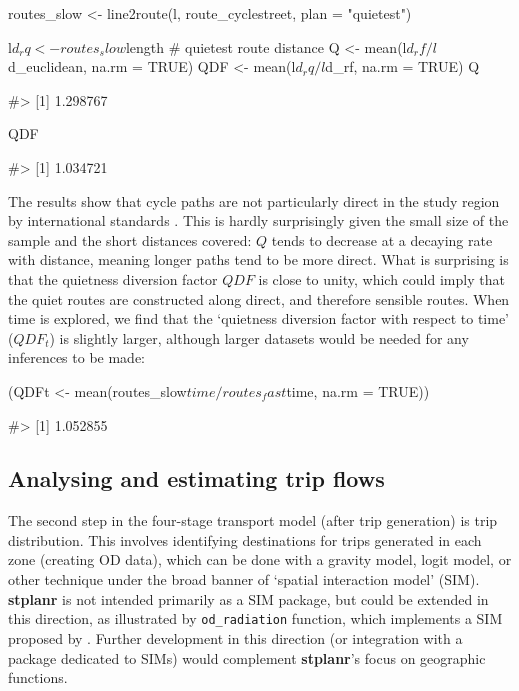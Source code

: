 \begin{Schunk}
\begin{Sinput}
routes_slow <- line2route(l, route_cyclestreet, plan = "quietest")
\end{Sinput}
\end{Schunk}

\begin{Schunk}
\begin{Sinput}
l$d_rq <- routes_slow$length # quietest route distance
Q <- mean(l$d_rf / l$d_euclidean, na.rm = TRUE)
QDF <- mean(l$d_rq / l$d_rf, na.rm = TRUE)
Q
\end{Sinput}
\begin{Soutput}
#> [1] 1.298767
\end{Soutput}
\begin{Sinput}
QDF
\end{Sinput}
\begin{Soutput}
#> [1] 1.034721
\end{Soutput}
\end{Schunk}

The results show that cycle paths are not particularly direct in the
study region by international standards \citep{crow_design_2007}. This
is hardly surprisingly given the small size of the sample and the short
distances covered: \(Q\) tends to decrease at a decaying rate with
distance, meaning longer paths tend to be more direct.
What is surprising is that the quietness diversion factor
\(QDF\) is close to unity, which
could imply that the quiet routes are constructed along direct, and
therefore sensible routes.
When time is
explored, we find that the `quietness diversion factor with respect to
time' (\(QDF_t\)) is slightly larger,
although larger datasets would be needed for any inferences to be made:

\begin{Schunk}
\begin{Sinput}
(QDFt <- mean(routes_slow$time / routes_fast$time, na.rm = TRUE))
\end{Sinput}
\begin{Soutput}
#> [1] 1.052855
\end{Soutput}
\end{Schunk}

\subsection{Analysing and estimating trip flows}\label{models-of-travel-behaviour}

The second step in the four-stage transport model (after trip generation) is trip distribution.
This involves identifying destinations for trips generated in each zone (creating OD data), which can be done with a gravity model, logit model, or other technique under the broad banner of `spatial interaction model' (SIM).
\textbf{stplanr} is not intended primarily as a SIM package, but could be extended in this direction, as illustrated by \texttt{od\_radiation} function, which implements a SIM proposed by \citet{simini_universal_2012}.
Further development in this direction (or integration with a package dedicated to SIMs) would complement \textbf{stplanr}'s focus on geographic functions.

